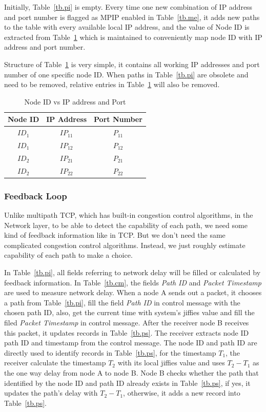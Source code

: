 Initially, Table~\ref{tb.pi} is empty. Every time one new combination of IP address and port number is flagged as MPIP enabled in Table~\ref{tb.me}, it adds new paths to the table with every available local IP address, and the value of Node ID is extracted from Table~\ref{tb.wi} which is maintained to conveniently map node ID with IP address and port number. 

Structure of Table~\ref{tb.wi} is very simple, it contains all working IP addresses and port number of one specific node ID. When paths in Table~\ref{tb.pi} are obsolete and need to be removed, relative entries in Table~\ref{tb.wi} will also be removed.

\begin{table}[htbp]
\caption{\label{tb.wi}Node ID vs IP address and Port}
\centering
\begin{tabular}{|c|c|c|}
\hline
 Node ID  & IP Address & Port Number\\
\hline
${ID}_{1}$&${IP}_{11}$&${P}_{11}$ \\
\hline
${ID}_{1}$&${IP}_{12}$&${P}_{12}$ \\
\hline
${ID}_{2}$&${IP}_{21}$&${P}_{21}$ \\
\hline
${ID}_{2}$&${IP}_{22}$&${P}_{22}$ \\
\hline
\end{tabular}
\end{table}


\subsubsection{Feedback Loop}

Unlike multipath TCP, which has built-in congestion control algorithms, in the Network layer, to be able to detect the capability of each path, we need some kind of feedback information like in TCP. But we don\textquoteright t need the same complicated congestion control algorithms. Instead, we just roughly estimate capability of each path to make a choice.

In Table~\ref{tb.pi}, all fields referring to network delay will be filled or calculated by feedback information. In Table~\ref{tb.cm}, the fields \emph{Path ID} and \emph{Packet Timestamp} are used to measure network delay. When a node A sends out a packet, it chooses a path from Table~\ref{tb.pi}, fill the field \emph{Path ID} in control message with the chosen path ID, also, get the current time with system\textquoteright s jiffies value and fill the filed \emph{Packet Timestamp} in control message. After the receiver node B receives this packet, it updates records in Table~\ref{tb.ps}. The receiver extracts node ID path ID and timestamp from the control message. The node ID and path ID are directly used to identify records in Table~\ref{tb.ps}, for the timestamp $T_1$, the receiver calculate the timestamp $T_2$ with its local jiffies value and uses $T_2-T_1$ as the one way delay from node A to node B. Node B checks whether the path that identified by the node ID and path ID already exists in Table~\ref{tb.ps}, if yes, it updates the path\textquoteright s delay with $T_2-T_1$, otherwise, it adds a new record into Table~\ref{tb.ps}.

